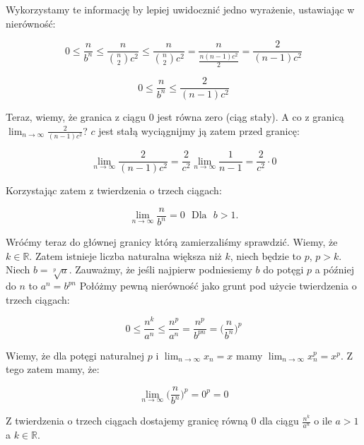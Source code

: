 \documentclass[a4paper,oneside,openright,11pt]{article}
\numberwithin{equation}{section}
\begin{document}
\noindent
Wykorzystamy te informację by lepiej uwidocznić jedno wyrażenie, ustawiając w nierówność:

\begin{equation*}
    0 \leq \frac{n}{b^n} \leq \frac{n}{{n \choose 2} c^2} \leq \frac{n}{{n \choose 2} c^2} = \frac{n}{\frac{n(n-1)c^2}{2}} = \frac{2}{(n-1)c^2}
\end{equation*}

\begin{equation*}
    0 \leq \frac{n}{b^n} \leq \frac{2}{(n-1)c^2}
\end{equation*}

\noindent
Teraz, wiemy, że granica z ciągu $0$ jest równa zero (ciąg stały). A co z granicą $\lim_{n\to\infty} \frac{2}{(n-1)c^2}$?
$c$ jest stałą wyciągnijmy ją zatem przed granicę:

\begin{equation*}
    \lim_{n\to\infty} \frac{2}{(n-1)c^2} = \frac{2}{c^2} \lim_{n\to\infty} \frac{1}{n-1} = \frac{2}{c^2} \cdot 0
\end{equation*}

Korzystając zatem z twierdzenia o trzech ciągach:

\begin{equation*}
    \lim_{n\to\infty} \frac{n}{b^n} = 0 \ \ \ \mbox{Dla} \ \ \ b > 1.
\end{equation*}

\noindent
Wróćmy teraz do głównej granicy którą zamierzaliśmy sprawdzić. Wiemy, że $k \in \mathbb{R}$. Zatem istnieje liczba naturalna większa niż $k$, niech będzie to $p$, $p > k$.
Niech $b = \sqrt[p]{a}$. Zauważmy, że jeśli najpierw podniesiemy $b$ do potęgi $p$ a później do $n$ to $a^n = b^{pn}$ Połóżmy pewną nierówność jako grunt pod użycie twierdzenia o trzech ciągach:

\begin{equation*}
    0 \leq \frac{n^k}{a^n} \leq \frac{n^p}{a^n} = \frac{n^p}{b^{pn}} = \Big(\frac{n}{b^n}\Big)^p
\end{equation*}

\noindent
Wiemy, że dla potęgi naturalnej $p$ i $\lim_{n\to\infty} x_{n} = x$ mamy $\lim_{n\to\infty} x_{n}^p = x^p$. Z tego zatem mamy, że:

\begin{equation*}
    \lim_{n\to\infty} \Big(\frac{n}{b^n}\Big)^p = 0^p = 0
\end{equation*}

\noindent
Z twierdzenia o trzech ciągach dostajemy granicę równą $0$ dla ciągu $\frac{n^k}{a^n}$ o ile $a > 1$ a $k \in \mathbb{R}$.
\end{document}
